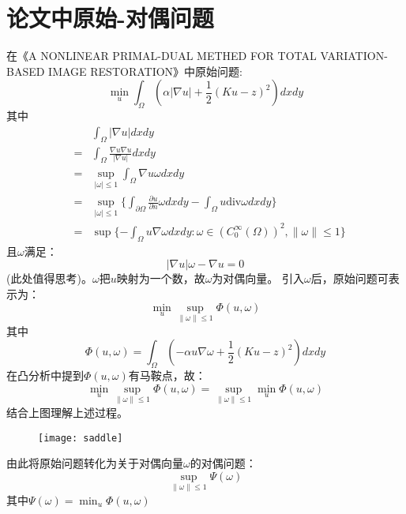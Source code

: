 \documentclass[a4paper,12pt]{article}
\begin{document}
\section{论文中原始-对偶问题}
在《A NONLINEAR PRIMAL-DUAL METHED FOR TOTAL VARIATION-BASED IMAGE RESTORATION》中原始问题:
\begin{equation}
\min_u \int_{\Omega}(\alpha|\nabla u|+\frac{1}{2}(Ku-z)^2)dxdy
\end{equation}
其中
\begin{eqnarray}
&&\int_{\Omega}|\nabla u|dxdy\\
&=&\int_{\Omega}\frac{\nabla u\nabla u}{|\nabla u|}dxdy\\
&=&\sup_{|\omega|\le 1}\int_{\Omega}\nabla u \omega dxdy\\
&=&\sup_{|\omega|\le 1}\{\int_{\partial\Omega}\frac{\partial u}{\partial n} \omega dxdy-\int_{\Omega}u \textrm{div}\omega dxdy\}\\
&=&\sup \{-\int_{\Omega}u\nabla \omega dxdy:\omega \in(C^{\infty}_0(\Omega))^2,\parallel \omega \parallel \le 1\}
\end{eqnarray}
且$\omega$满足：
\begin{equation}
|\nabla u|\omega-\nabla u=0
\end{equation}
(此处值得思考)。$\omega$把$u$映射为一个数，故$\omega$为对偶向量。
引入$\omega$后，原始问题可表示为：
\begin{equation}
\min_u \sup_{\parallel \omega \parallel \le 1}\Phi(u,\omega)
\end{equation}
其中
\begin{equation}
\Phi(u,\omega)=\int_{\Omega}(-\alpha u \nabla \omega+\frac{1}{2}(Ku-z)^2)dxdy
\end{equation}
在凸分析中提到$\Phi(u,\omega)$有马鞍点，故：
\begin{equation}
\min_u \sup_{\parallel \omega \parallel \le 1}\Phi(u,\omega)=\sup_{\parallel \omega \parallel \le 1}\min_u \Phi(u,\omega)
\end{equation}
结合上图理解上述过程。
\begin{figure}
 \texttt{[image: saddle]}
\end{figure}

由此将原始问题转化为关于对偶向量$\omega$的对偶问题：
\begin{equation}
\sup_{\parallel \omega \parallel \le 1} \Psi(\omega)
\end{equation}
其中$\Psi(\omega)=\min_u \Phi(u,\omega)$
\newline
\newline
\end{document}

